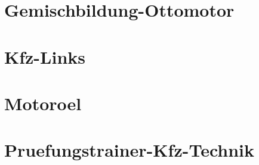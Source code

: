 \chapter{Gemischbildung-Ottomotor}
%
\chapter{Kfz-Links}
%
\chapter{Motoroel}
%
\chapter{Pruefungstrainer-Kfz-Technik}
%



%
%



%



